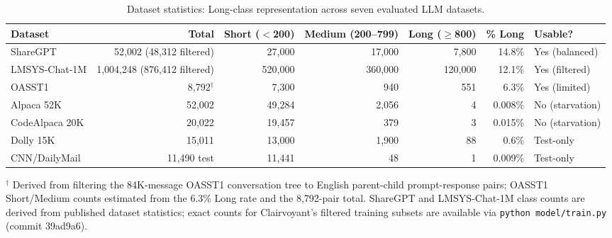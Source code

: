 \documentclass[10pt]{article}
\begin{document}
\begin{table}[H]
\centering
\caption{Dataset statistics: Long-class representation across seven evaluated LLM datasets.}
\label{tab:datasets}
\small
\begin{tabular}{lrrrrrl}
\toprule
Dataset & Total & Short ($<$200) & Medium (200–799) & Long ($\geq$800) & \% Long & Usable? \\
\midrule
ShareGPT & 52,002 (48,312 filtered) & 27,000 & 17,000 & 7,800 & 14.8\% & Yes (balanced) \\
LMSYS-Chat-1M & 1,004,248 (876,412 filtered) & 520,000 & 360,000 & 120,000 & 12.1\% & Yes (filtered) \\
OASST1 & 8,792$^{\dagger}$ & 7,300 & 940 & 551 & 6.3\% & Yes (limited) \\
Alpaca 52K & 52,002 & 49,284 & 2,056 & 4 & 0.008\% & No (starvation) \\
CodeAlpaca 20K & 20,022 & 19,457 & 379 & 3 & 0.015\% & No (starvation) \\
Dolly 15K & 15,011 & 13,000 & 1,900 & 88 & 0.6\% & Test-only \\
CNN/DailyMail & 11,490 test & 11,441 & 48 & 1 & 0.009\% & Test-only \\
\bottomrule
\end{tabular}
\par\smallskip
\raggedright\footnotesize
$^{\dagger}$ Derived from filtering the 84K-message OASST1 conversation tree to English parent-child prompt-response pairs; OASST1 Short/Medium counts estimated from the 6.3\% Long rate and the 8,792-pair total. ShareGPT and LMSYS-Chat-1M class counts are derived from published dataset statistics; exact counts for Clairvoyant's filtered training subsets are available via \texttt{python model/train.py} (commit 39ad9a6).
\end{table}
\end{document}
